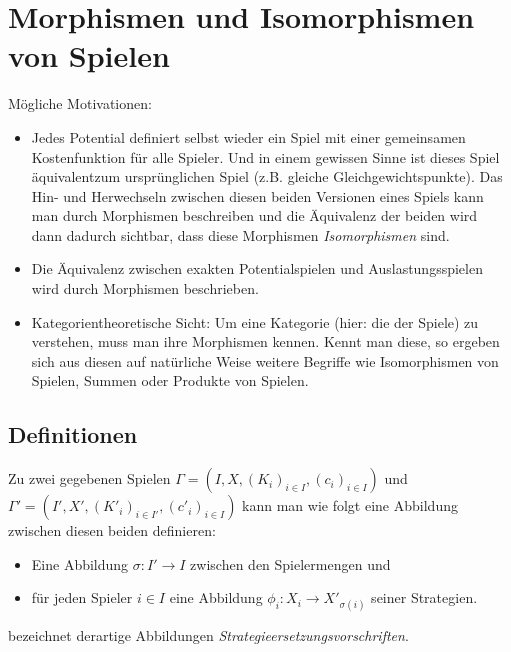 \section[Morphismen]{Morphismen und Isomorphismen von Spielen}\label{sec:Morphismen}


Mögliche Motivationen:
\begin{itemize}
	\item Jedes Potential definiert selbst wieder ein Spiel mit einer gemeinsamen Kostenfunktion für alle Spieler. Und in einem gewissen Sinne ist dieses Spiel \glqq äquivalent\grqq zum ursprünglichen Spiel (z.B. gleiche Gleichgewichtspunkte). Das Hin- und Herwechseln zwischen diesen beiden Versionen eines Spiels kann man durch Morphismen beschreiben und die Äquivalenz der beiden wird dann dadurch sichtbar, dass diese Morphismen \emph{Isomorphismen} sind.
	\item Die Äquivalenz zwischen exakten Potentialspielen und Auslastungsspielen wird durch Morphismen beschrieben.
	\item Kategorientheoretische Sicht: Um eine Kategorie (hier: die der Spiele) zu verstehen, muss man ihre Morphismen kennen. Kennt man diese, so ergeben sich aus diesen auf natürliche Weise weitere Begriffe wie Isomorphismen von Spielen, Summen oder Produkte von Spielen.
\end{itemize}


\subsection{Definitionen}

Zu zwei gegebenen Spielen $\Gamma = (I, X, (K_i)_{i\in I}, (c_i)_{i\in I})$ und $\Gamma' = (I', X', (K'_i)_{i\in I'}, (c'_i)_{i\in I})$ kann man wie folgt eine Abbildung zwischen diesen beiden definieren:
\begin{itemize}
	\item Eine Abbildung $\sigma: I' \to I$ zwischen den Spielermengen und
	\item für jeden Spieler $i \in I$ eine Abbildung $\phi_i: X_i \to X'_{\sigma(i)}$ seiner Strategien.
\end{itemize}
\cite{Polyequilibrium} bezeichnet derartige Abbildungen \emph{Strategieersetzungsvorschriften}.

